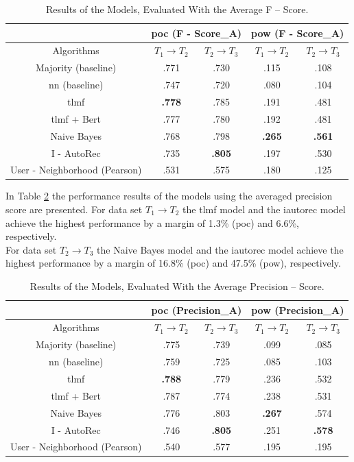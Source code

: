 \begin{table}[h!]
    \centering
    \begin{tabular}{|c|c|c|c|c|}
    \hline
     & \multicolumn{2}{|c|}{\acrshort{poc} (F - Score_A)} & \multicolumn{2}{|c|}{\acrshort{pow} (F - Score_A)} \\
     \hline
    Algorithms & $T_1 \to T_2$ & $T_2 \to T_3$ & $T_1 \to T_2$ & $T_2 \to T_3$\\
    \hline  Majority (baseline) & .771 & .730 & .115 & .108 \\ 
    \acrshort{nn} (baseline) & .747 & .720 & .080 & .104\\
    \acrshort{tlmf} & \textbf{.778} & .785 & .191 & .481\\
    \acrshort{tlmf} + Bert & .777 & .780  & .192 & .481 \\
    Naive Bayes & .768 & .798 & \textbf{.265} & \textbf{.561} \\
    I - AutoRec & .735 & \textbf{.805} & .197 & .530\\
    User - Neighborhood (Pearson) & .531 & .575 & .180 & .125\\
    \hline
    \end{tabular}
    \caption{Results of the Models, Evaluated With the Average F – Score.}
    \label{tab:results_f1_mean}
\end{table}
\noindent In Table \ref{tab:results_precision_mean} the performance results of the models using the averaged precision score are presented. For data set $T_1 \to T_2$ the \acrshort{tlmf} model and the \acrshort{iautorec} model achieve the highest performance by a margin of 1.3\% (\acrshort{poc}) and 6.6\%, respectively.\\
For data set $T_2 \to T_3$ the Naive Bayes model and the \acrshort{iautorec} model achieve the highest performance by a margin of 16.8\% (\acrshort{poc}) and 47.5\% (\acrshort{pow}), respectively.
\begin{table}[h!]
    \centering
    \begin{tabular}{|c|c|c|c|c|}
    \hline
     & \multicolumn{2}{|c|}{\acrshort{poc} (Precision_A)} & \multicolumn{2}{|c|}{\acrshort{pow} (Precision_A)} \\
     \hline
    Algorithms & $T_1 \to T_2$ & $T_2 \to T_3$ & $T_1 \to T_2$ & $T_2 \to T_3$\\
    \hline  Majority (baseline) & .775 & .739 & .099 & .085 \\ 
    \acrshort{nn} (baseline) & .759 & .725 & .085 & .103\\
    \acrshort{tlmf} & \textbf{.788} & .779 & .236 & .532 \\
    \acrshort{tlmf} + Bert & .787 & .774 & .238 & .531\\
    Naive Bayes & .776 & .803 & \textbf{.267} & .574 \\
    I - AutoRec & .746 & \textbf{.805} & .251 & \textbf{.578}\\
    User - Neighborhood (Pearson) & .540 & .577 & .195 & .195\\
    \hline
    \end{tabular}
    \caption{Results of the Models, Evaluated With the Average Precision – Score.}
    \label{tab:results_precision_mean}
\end{table}

